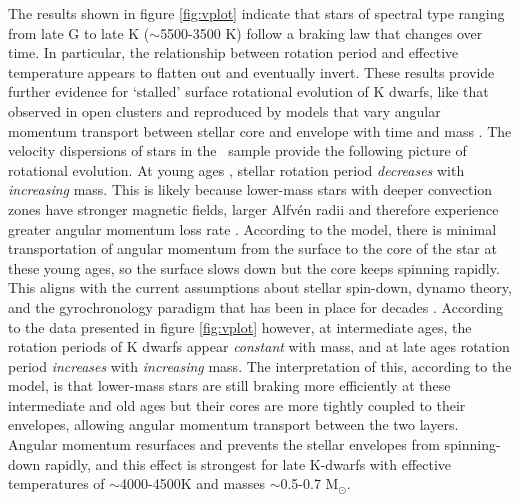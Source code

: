 The results shown in figure \ref{fig:vplot} indicate that stars of spectral
type ranging from late G to late K ($\sim$5500-3500 K) follow a braking law
that changes over time.
In particular, the relationship between rotation period and effective
temperature appears to flatten out and eventually invert.
These results provide further evidence for `stalled' surface rotational
evolution of K dwarfs, like that observed in open clusters \citep{curtis2019}
and reproduced by models that vary angular momentum transport between stellar
core and envelope with time and mass \citep{spada2019}.
The velocity dispersions of stars in the \mct\ sample provide the following
picture of rotational evolution.
At young ages \citep[younger than around 1 Gyr but still old enough to be on
the main sequence and have transitioned from the `I' sequence to the `C'
sequence ][]{barnes2003}, stellar rotation period {\it decreases} with {\it
increasing} mass.
This is likely because lower-mass stars with deeper convection zones have
stronger magnetic fields, larger Alfv\'en radii and therefore experience
greater angular momentum loss rate \citep[\eg][]{schatzman1962, parker1970,
kawaler1988, charbonneau2010}.
According to the \citet{spada2019} model, there is minimal transportation of
angular momentum from the surface to the core of the star at these young ages,
so the surface slows down but the core keeps spinning rapidly.
This aligns with the current assumptions about stellar spin-down, dynamo
theory, and the gyrochronology paradigm that has been in place for decades
\citep[\eg][]{skumanich1972, noyes1984, kawaler1988, barnes2003, angus2019}.
According to the data presented in figure \ref{fig:vplot} however, at
intermediate ages, the rotation periods of K dwarfs appear {\it constant} with
mass, and at late ages rotation period {\it increases} with {\it increasing}
mass.
The interpretation of this, according to the \citet{spada2019} model, is that
lower-mass stars are still braking more efficiently at these intermediate and
old ages but their cores are more tightly coupled to their envelopes, allowing
angular momentum transport between the two layers.
Angular momentum resurfaces and prevents the stellar envelopes from
spinning-down rapidly, and this effect is strongest for late K-dwarfs with
effective temperatures of $\sim$4000-4500K and masses $\sim$0.5-0.7 M$_\odot$.

